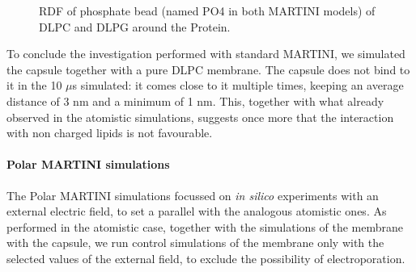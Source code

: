 \begin{figure}[t!]
\centering
{}
\caption[Proximity of lipids phosphate to bound capsule]{RDF of phosphate bead (named PO4 in both MARTINI models) of DLPC and DLPG around the Protein.}
\label{fig:PO4_RDF_dens}
\end{figure}

To conclude the investigation performed with standard MARTINI, we simulated the capsule together with a pure DLPC membrane. The capsule does not bind to it in the 10 $\mu$s simulated: it comes close to it multiple times, keeping an average distance of 3 nm and a minimum of 1 nm. This, together with what already observed in the atomistic simulations, suggests once more that the interaction with non charged lipids is not favourable.

\paragraph{Polar MARTINI simulations} 
The Polar MARTINI simulations focussed on \emph{in silico} experiments with an external electric field, to set a parallel with the analogous atomistic ones.
%
As performed in the atomistic case, together with the simulations of the membrane with the capsule, we run control simulations of the membrane only with the selected values of the external field, to exclude the possibility of electroporation.

